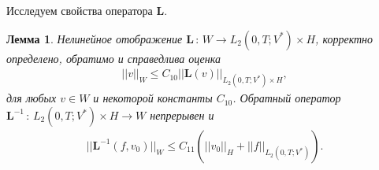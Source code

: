 \documentclass[14pt, a4paper]{extarticle}
\newtheorem{lemma}{Лемма}[section]
\numberwithin{equation}{section}
\begin{document}
    Исследуем свойства оператора $\boldsymbol{L}$.
    \begin{lemma}
        Нелинейное отображение $\boldsymbol{L}\, : \,W \rightarrow L_2(0,T;V^*) \times H$, корректно определено, обратимо и справедлива оценка
        \begin{equation}\label{eq:4.5}
            \begin{gathered}
                ||v||_W \leq C_{10} ||\boldsymbol{L}(v)||_{L_2(0,T;V^*) \times H},
            \end{gathered}
        \end{equation}
        \noindent для любых $v \in W$ и некоторой константы $C_{10}$.
        Обратный оператор $\boldsymbol{L}^{-1}\, : \, L_2(0,T;V^*) \times H \rightarrow W$ непрерывен и
        \begin{equation*}
            \begin{gathered}
                ||\boldsymbol{L}^{-1}(f, v_0)||_W \leq C_{11}(||v_0||_H + ||f||_{L_2(0,T;V^*)}).
            \end{gathered}
        \end{equation*}
    \end{lemma}
\end{document}
